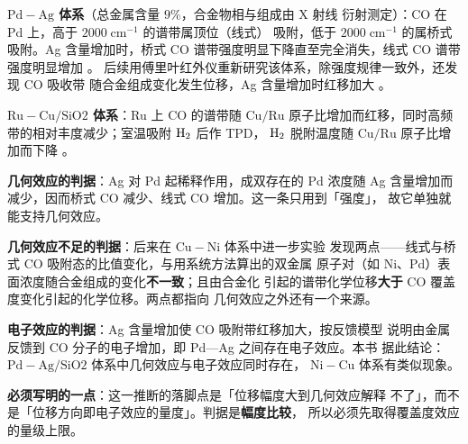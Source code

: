 \begin{obs}
\textbf{$\mathrm{Pd{-}Ag}$ 体系}（总金属含量 $9\%$，合金物相与组成由 X 射线
衍射测定）：CO 在 Pd 上，高于 $2000\;\mathrm{cm^{-1}}$ 的谱带属顶位（线式）
吸附，低于 $2000\;\mathrm{cm^{-1}}$ 的属桥式吸附。Ag 含量增加时，桥式 CO
谱带强度明显下降直至完全消失，线式 CO 谱带强度明显增加
。
后续用傅里叶红外仪重新研究该体系，除强度规律一致外，还发现 CO 吸收带
随合金组成变化发生位移，Ag 含量增加时红移加大
。

\textbf{$\mathrm{Ru{-}Cu/SiO2}$ 体系}：Ru 上 CO 的谱带随 $\mathrm{Cu/Ru}$
原子比增加而红移，同时高频带的相对丰度减少；室温吸附 $\ce{H2}$ 后作 TPD，
$\ce{H2}$ 脱附温度随 $\mathrm{Cu/Ru}$ 原子比增加而下降
。
\end{obs}

\begin{infer}
\textbf{几何效应的判据}：Ag 对 Pd 起稀释作用，成双存在的 Pd 浓度随 Ag
含量增加而减少，因而桥式 CO 减少、线式 CO 增加。这一条只用到「强度」，
故它单独就能支持几何效应。

\textbf{几何效应不足的判据}：后来在 $\mathrm{Cu{-}Ni}$ 体系中进一步实验
发现两点——线式与桥式 CO 吸附态的比值变化，与用系统方法算出的双金属
原子对（如 Ni、Pd）表面浓度随合金组成的变化\textbf{不一致}；且由合金化
引起的谱带化学位移\textbf{大于} CO 覆盖度变化引起的化学位移。两点都指向
几何效应之外还有一个来源。

\textbf{电子效应的判据}：Ag 含量增加使 CO 吸附带红移加大，按反馈模型
说明由金属反馈到 CO 分子的电子增加，即 Pd—Ag 之间存在电子效应。本书
据此结论：$\mathrm{Pd{-}Ag/SiO2}$ 体系中几何效应与电子效应同时存在，
$\mathrm{Ni{-}Cu}$ 体系有类似现象。

\textbf{必须写明的一点}：这一推断的落脚点是「位移幅度大到几何效应解释
不了」，而不是「位移方向即电子效应的量度」。判据是\textbf{幅度比较}，
所以必须先取得覆盖度效应的量级上限。
\end{infer}

